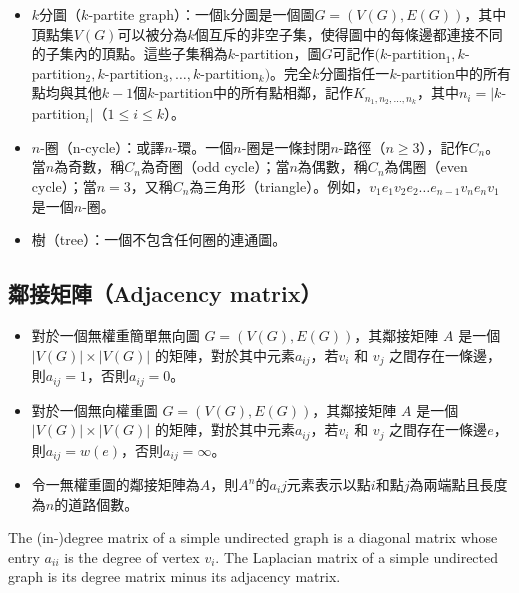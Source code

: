 \documentclass[a4paper,12pt]{report}
\begin{document}
\begin{itemize}
\item $k$分圖（$k$-partite graph）：一個k分圖是一個圖$G=(V(G), E(G))$，其中頂點集$V(G)$可以被分為$k$個互斥的非空子集，使得圖中的每條邊都連接不同的子集內的頂點。這些子集稱為$k$-partition，圖$G$可記作$(k$-partition$_1, k$-partition$_2, k$-partition$_3, \ldots, k$-partition$_k)$。完全$k$分圖指任一$k$-partition中的所有點均與其他$k-1$個$k$-partition中的所有點相鄰，記作$K_{n_1, n_2, \ldots, n_k}$，其中$n_i=|k$-partition$_i|$（$1\leq i\leq k$）。
\item $n$-圈（n-cycle）：或譯$n$-環。一個$n$-圈是一條封閉$n$-路徑（$n\geq$3），記作$C_n$。當$n$為奇數，稱$C_n$為奇圈（odd cycle）；當$n$為偶數，稱$C_n$為偶圈（even cycle）；當$n=3$，又稱$C_n$為三角形（triangle）。例如，$v_1e_1v_2e_2\ldots e_{n-1}v_ne_nv_1$是一個$n$-圈。
\item 樹（tree）：一個不包含任何圈的連通圖。
\end{itemize}
\subsection{鄰接矩陣（Adjacency matrix）}
\begin{itemize}
\item 對於一個無權重簡單無向圖 $G=(V(G), E(G))$，其鄰接矩陣 $A$ 是一個 $|V(G)|\times|V(G)|$ 的矩陣，對於其中元素$a_{ij}$，若$v_i$ 和 $v_j$ 之間存在一條邊，則$a_{ij}=1$，否則$a_{ij}=0$。
\item 對於一個無向權重圖 $G=(V(G), E(G))$，其鄰接矩陣 $A$ 是一個 $|V(G)|\times|V(G)|$ 的矩陣，對於其中元素$a_{ij}$，若$v_i$ 和 $v_j$ 之間存在一條邊$e$，則$a_{ij}=w(e)$，否則$a_{ij}=\infty$。
\item 令一無權重圖的鄰接矩陣為$A$，則$A^n$的$a_ij$元素表示以點$i$和點$j$為兩端點且長度為$n$的道路個數。
\end{itemize}
The (in-)degree matrix of a simple undirected graph is a diagonal matrix whose entry $a_{ii}$ is the degree of vertex $v_i$.
The Laplacian matrix of a simple undirected graph is its degree matrix minus its adjacency matrix.
\end{document}

